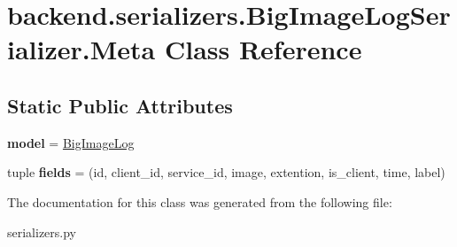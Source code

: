 \hypertarget{classbackend_1_1serializers_1_1_big_image_log_serializer_1_1_meta}{}\section{backend.\+serializers.\+Big\+Image\+Log\+Serializer.\+Meta Class Reference}
\label{classbackend_1_1serializers_1_1_big_image_log_serializer_1_1_meta}
\subsection*{Static Public Attributes}
\begin{DoxyCompactItemize}
\item 
\mbox{\label{classbackend_1_1serializers_1_1_big_image_log_serializer_1_1_meta_a681235c1c088390e50d25550342e5026}} 
{\bfseries model} = \hyperlink{classbackend_1_1models_1_1_big_image_log}{Big\+Image\+Log}
\item 
\mbox{\label{classbackend_1_1serializers_1_1_big_image_log_serializer_1_1_meta_a1def8357c9828f7b4237cd81de01c908}} 
tuple {\bfseries fields} = (\textquotesingle{}id\textquotesingle{}, \textquotesingle{}client\+\_\+id\textquotesingle{}, \textquotesingle{}service\+\_\+id\textquotesingle{}, \textquotesingle{}image\textquotesingle{}, \textquotesingle{}extention\textquotesingle{}, \textquotesingle{}is\+\_\+client\textquotesingle{}, \textquotesingle{}time\textquotesingle{}, \textquotesingle{}label\textquotesingle{})
\end{DoxyCompactItemize}


The documentation for this class was generated from the following file\+:\begin{DoxyCompactItemize}
\item 
serializers.\+py\end{DoxyCompactItemize}

